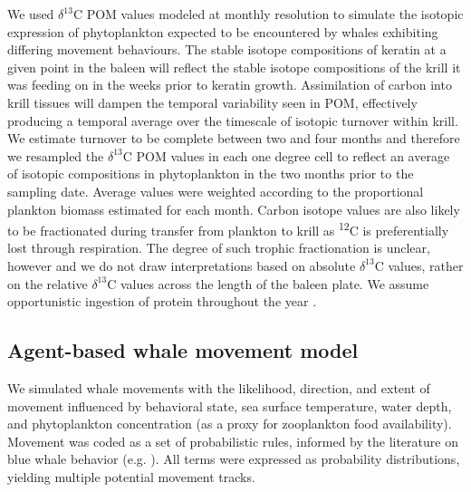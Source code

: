 \documentclass[a4paper,12pt]{article}
\begin{document}
We used \(\delta^{13}\)C POM values modeled at monthly resolution to simulate the isotopic expression of phytoplankton expected to be encountered by whales exhibiting differing movement behaviours. 
The stable isotope compositions of keratin at a given point in the baleen will reflect the stable isotope compositions of the krill it was feeding on in the weeks prior to keratin growth. 
Assimilation of carbon into krill tissues will dampen the temporal variability seen in POM, effectively producing a temporal average over the timescale of isotopic turnover within krill. 
We estimate turnover to be complete between two and four months and therefore we resampled the \(\delta^{13}\)C POM values in each one degree cell to reflect an average of isotopic compositions in phytoplankton in the two months prior to the sampling date. 
Average values were weighted according to the proportional plankton biomass estimated for each month. 
Carbon isotope values are also likely to be fractionated during transfer from plankton to krill as \textsuperscript{12}C is preferentially lost through respiration. 
The degree of such trophic fractionation is unclear, however and we do not draw interpretations based on absolute \(\delta^{13}\)C values, rather on the relative \(\delta^{13}\)C values across the length of the baleen plate. 
We assume opportunistic ingestion of protein throughout the year \cite{baines2017autumn,silva2013north,visser2011timing,busquets2017estimating, lesage2017foraging, bailey2009behavioural}.

\subsection{Agent-based whale movement
model}\label{agent-based-whale-movement-model}

We simulated whale movements with the likelihood, direction, and extent of movement influenced by behavioral state, sea surface temperature, water depth, and phytoplankton concentration (as a proxy for zooplankton food availability).
Movement was coded as a set of probabilistic rules, informed by the literature on blue whale behavior (e.g. \cite{handbook}).
All terms were expressed as probability distributions, yielding multiple potential movement tracks.
\end{document}
